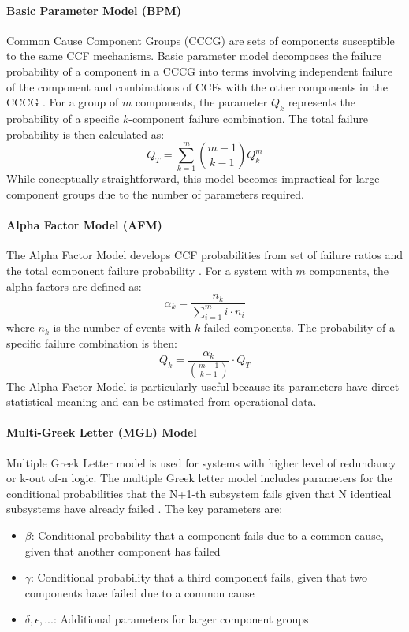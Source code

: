 \paragraph{Basic Parameter Model (BPM)}
Common Cause Component Groups (CCCG) are sets of components susceptible to the same CCF mechanisms. Basic parameter model decomposes the failure probability of a component in a CCCG into terms involving independent failure of the component and combinations of CCFs with the other components in the CCCG \cite{rasmuson_kelly_2008}. For a group of $m$ components, the parameter $Q_k$ represents the probability of a specific $k$-component failure combination. The total failure probability is then calculated as:
\[
Q_T = \sum_{k=1}^{m} \binom{m-1}{k-1} Q_k^m
\]
While conceptually straightforward, this model becomes impractical for large component groups due to the number of parameters required.

\paragraph{Alpha Factor Model (AFM)}
The Alpha Factor Model develops CCF probabilities from set of failure ratios and the total component failure probability \cite{rasmuson_kelly_2008}. For a system with $m$ components, the alpha factors are defined as:
\[
\alpha_k = \frac{n_k}{\sum_{i=1}^{m} i \cdot n_i}
\]
where $n_k$ is the number of events with $k$ failed components. The probability of a specific failure combination is then:
\[
Q_k = \frac{\alpha_k}{\binom{m-1}{k-1}} \cdot Q_T
\]
The Alpha Factor Model is particularly useful because its parameters have direct statistical meaning and can be estimated from operational data.

\paragraph{Multi-Greek Letter (MGL) Model}
Multiple Greek Letter model is used for systems with higher level of redundancy or k-out of-n logic. The multiple Greek letter model includes parameters for the conditional probabilities that the N+1-th subsystem fails given that N identical subsystems have already failed \cite{jones_2012}. The key parameters are:
\begin{itemize}
  \item $\beta$: Conditional probability that a component fails due to a common cause, given that another component has failed
  \item $\gamma$: Conditional probability that a third component fails, given that two components have failed due to a common cause
  \item $\delta, \epsilon, ... $: Additional parameters for larger component groups
\end{itemize}

